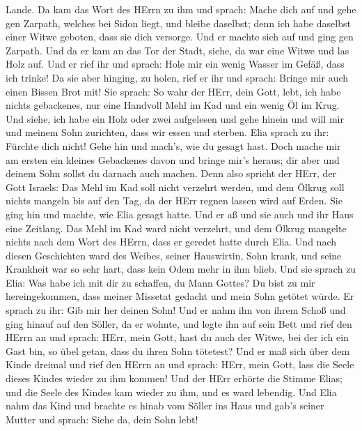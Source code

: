 Lande.  Da kam das Wort des HErrn zu ihm und sprach:
 Mache dich auf und gehe gen Zarpath, welches bei Sidon
liegt, und bleibe daselbst; denn ich habe daselbst einer Witwe geboten,
dass sie dich versorge.  Und er machte sich auf und ging
gen Zarpath. Und da er kam an das Tor der Stadt, siehe, da war eine
Witwe und las Holz auf. Und er rief ihr und sprach: Hole mir ein wenig
Wasser im Gefäß, dass ich trinke!  Da sie aber hinging, zu
holen, rief er ihr und sprach: Bringe mir auch einen Bissen Brot mit!
 Sie sprach: So wahr der HErr, dein Gott, lebt, ich habe
nichts gebackenes, nur eine Handvoll Mehl im Kad und ein wenig Öl im
Krug. Und siehe, ich habe ein Holz oder zwei aufgelesen und gehe hinein
und will mir und meinem Sohn zurichten, dass wir essen und sterben.
 Elia sprach zu ihr: Fürchte dich nicht! Gehe hin und
mach's, wie du gesagt hast. Doch mache mir am ersten ein kleines
Gebackenes davon und bringe mir's heraus; dir aber und deinem Sohn
sollst du darnach auch machen.  Denn also spricht der HErr,
der Gott Israels: Das Mehl im Kad soll nicht verzehrt werden, und dem
Ölkrug soll nichts mangeln bis auf den Tag, da der HErr regnen lassen
wird auf Erden.  Sie ging hin und machte, wie Elia gesagt
hatte. Und er aß und sie auch und ihr Haus eine Zeitlang. 
Das Mehl im Kad ward nicht verzehrt, und dem Ölkrug mangelte nichts nach
dem Wort des HErrn, dass er geredet hatte durch Elia.  Und
nach diesen Geschichten ward des Weibes, seiner Hauswirtin, Sohn krank,
und seine Krankheit war so sehr hart, dass kein Odem mehr in ihm blieb.
 Und sie sprach zu Elia: Was habe ich mit dir zu schaffen,
du Mann Gottes? Du bist zu mir hereingekommen, dass meiner Missetat
gedacht und mein Sohn getötet würde.  Er sprach zu ihr: Gib
mir her deinen Sohn! Und er nahm ihn von ihrem Schoß und ging hinauf auf
den Söller, da er wohnte, und legte ihn auf sein Bett  und
rief den HErrn an und sprach: HErr, mein Gott, hast du auch der Witwe,
bei der ich ein Gast bin, so übel getan, dass du ihren Sohn tötetest?
 Und er maß sich über dem Kinde dreimal und rief den HErrn
an und sprach: HErr, mein Gott, lass die Seele dieses Kindes wieder zu
ihm kommen!  Und der HErr erhörte die Stimme Elias; und die
Seele des Kindes kam wieder zu ihm, und es ward lebendig. 
Und Elia nahm das Kind und brachte es hinab vom Söller ins Haus und
gab's seiner Mutter und sprach: Siehe da, dein Sohn lebt! 

